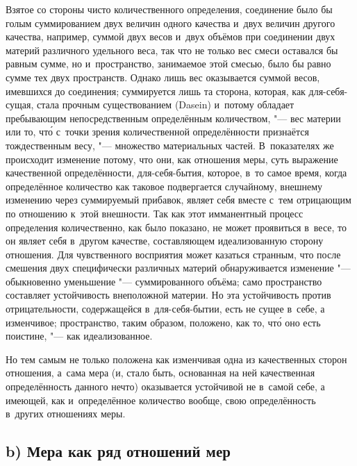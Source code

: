 Взятое со стороны чисто количественного определения, соединение было бы голым
суммированием двух величин одного качества и~двух величин другого качества,
например, суммой двух весов и~двух объёмов при соединении двух материй
различного удельного веса, так что не только вес смеси оставался бы равным
сумме, но и~пространство, занимаемое этой смесью, было бы равно сумме тех двух
пространств. Однако лишь вес оказывается суммой весов, имевшихся до соединения;
суммируется лишь та сторона, которая, как для-себя-сущая, стала прочным
существованием (Dasein) и~потому обладает пребывающим непосредственным
определённым количеством, "--- вес материи или то, чт\'{о} с~точки зрения
количественной определённости признаётся тождественным весу, "--- множество
материальных частей. В~показателях же происходит изменение потому, что они, как
отношения меры, суть выражение качественной определённости, для-себя-бытия,
которое, в~то самое время, когда определённое количество как таковое
подвергается случайному, внешнему изменению через суммируемый прибавок, являет
себя вместе с~тем отрицающим по отношению к~этой внешности. Так как этот
имманентный процесс определения количественно, как было показано, не может
проявиться в~весе, то он являет себя в~другом качестве, составляющем
идеализованную сторону отношения. Для чувственного восприятия может казаться
странным, что после смешения двух специфически различных материй обнаруживается
изменение "--- обыкновенно уменьшение "--- суммированного объёма; само
пространство составляет устойчивость внеположной материи. Но эта устойчивость
против отрицательности, содержащейся в~для-себя-бытии, есть не сущее в~себе, а
изменчивое; пространство, таким образом, положено, как то, чт\'{о} оно есть
поистине, "--- как идеализованное.

Но тем самым не только положена как изменчивая одна из качественных сторон
отношения, а~сама мера (и, стало быть, основанная на ней качественная
определённость данного нечто) оказывается устойчивой не в~самой себе, а
имеющей, как и~определённое количество вообще, свою определённость в~других
отношениях меры.

\subsection[b) Мера как ряд отношений мер]{b) Мера как ряд отношений мер}

